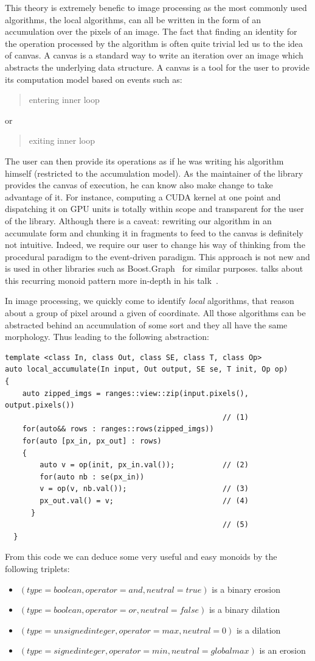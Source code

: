 This theory is extremely benefic to image processing as the most commonly used algorithms, the local algorithms, can all
be written in the form of an accumulation over the pixels of an image. The fact that finding an identity for the
operation processed by the algorithm is often quite trivial led us to the idea of canvas. A canvas is a standard way to
write an iteration over an image which abstracts the underlying data structure. A canvas is a tool for the user to
provide its computation model based on events such as: \blockquote{entering inner loop} or \blockquote{exiting inner
  loop}. The user can then provide its operations as if he was writing his algorithm himself (restricted to the
accumulation model). As the maintainer of the library provides the canvas of execution, he can know also make change to
take advantage of it. For instance, computing a CUDA kernel at one point and dispatching it on GPU units is totally
within scope and transparent for the user of the library. Although there is a caveat: rewriting our algorithm in an
accumulate form and chunking it in fragments to feed to the canvas is definitely not intuitive. Indeed, we require our
user to change his way of thinking from the procedural paradigm to the event-driven paradigm. This approach is not new
and is used in other libraries such as Boost.Graph~\cite{siek.2001.boostgraph} for similar purposes.
\citeauthor{dean.2019.monoids} talks about this recurring monoid pattern more in-depth in his
talk~\parencite{dean.2019.monoids}.

In image processing, we quickly come to identify \emph{local} algorithms, that reason about a group of pixel around a
given of coordinate. All those algorithms can be abstracted behind an accumulation of some sort and they all have the
same morphology. Thus leading to the following abstraction:
\begin{verbatim}
template <class In, class Out, class SE, class T, class Op>
auto local_accumulate(In input, Out output, SE se, T init, Op op)
{
    auto zipped_imgs = ranges::view::zip(input.pixels(), output.pixels())
                                                  // (1)
    for(auto&& rows : ranges::rows(zipped_imgs))
    for(auto [px_in, px_out] : rows)
    {
        auto v = op(init, px_in.val());           // (2)
        for(auto nb : se(px_in))
        v = op(v, nb.val());                      // (3)
        px_out.val() = v;                         // (4)
      }
                                                  // (5)
  }
\end{verbatim}
From this code we can deduce some very useful and easy monoids by the following triplets:
\begin{itemize}
  \item $(type = boolean, operator = and, neutral = true)$ is a binary erosion
  \item $(type = boolean, operator = or, neutral = false)$ is a binary dilation
  \item $(type = unsigned integer, operator = max, neutral = 0)$ is a dilation
  \item $(type = signed integer, operator = min, neutral = global max)$ is an erosion
\end{itemize}

